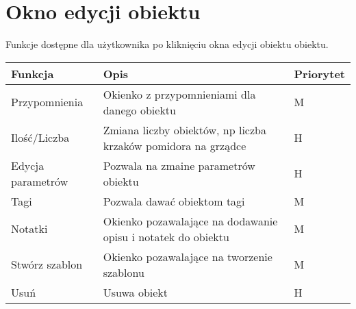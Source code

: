 \newpage
\section{Okno edycji obiektu}
Funkcje dostępne dla użytkownika po kliknięciu okna edycji obiektu obiektu.
\begin{table}[H]
    \begin{center}
    \label{tab:table}
    \begin{tabularx}{1.1\textwidth} { 
    >{\raggedright\arraybackslash}X 
    | >{\raggedright\arraybackslash}X 
    | >{\raggedleft\arraybackslash}X}
    \textbf{Funkcja} & \textbf{Opis} & \textbf{Priorytet}\\
    \hline
    Przypomnienia&Okienko z przypomnieniami dla danego obiektu&M\\
    \hline
    Ilość/Liczba&Zmiana liczby obiektów, np liczba krzaków pomidora na grządce&H\\
    \hline
    Edycja parametrów&Pozwala na zmaine parametrów obiektu&H\\
    \hline
    Tagi&Pozwala dawać obiektom tagi&M\\
    \hline
    Notatki&Okienko pozawalające na dodawanie opisu i notatek do obiektu&M\\
    \hline
    Stwórz szablon&Okienko pozawalające na tworzenie szablonu&M\\
    \hline
    Usuń&Usuwa obiekt&H\\
    \hline
    \end{tabularx}
    \end{center}
    \end{table}